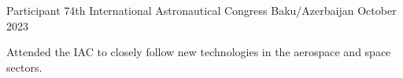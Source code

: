 

\begin{cventries}


  \cventry
    {Participant} %
    {74th International Astronautical Congress} %
    {Baku/Azerbaijan} %
    {October 2023} %
    {
      \begin{cvitems} %
        \item {Attended the IAC to closely follow new technologies in the aerospace and space sectors.}
      \end{cvitems}
    }
    
\end{cventries}